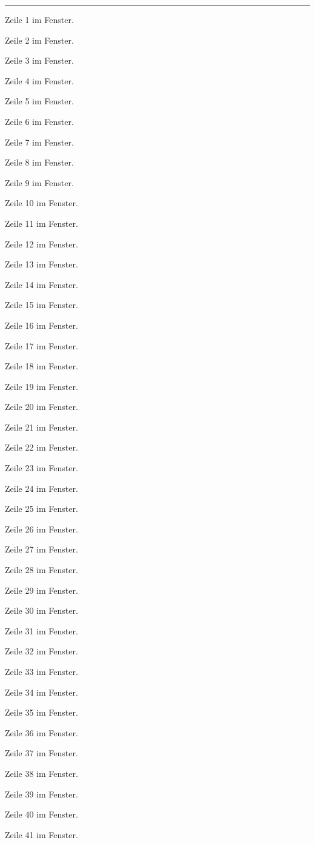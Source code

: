 \begin{Figure}[title=Tall Image Figure]
\rule{\linewidth}{90mm}
Zeile 1 im Fenster.

Zeile 2 im Fenster.

Zeile 3 im Fenster.

Zeile 4 im Fenster.

Zeile 5 im Fenster.

Zeile 6 im Fenster.

Zeile 7 im Fenster.

Zeile 8 im Fenster.

Zeile 9 im Fenster.

Zeile 10 im Fenster.

Zeile 11 im Fenster.

Zeile 12 im Fenster.

Zeile 13 im Fenster.

Zeile 14 im Fenster.

Zeile 15 im Fenster.

Zeile 16 im Fenster.

Zeile 17 im Fenster.

Zeile 18 im Fenster.

Zeile 19 im Fenster.

Zeile 20 im Fenster.

Zeile 21 im Fenster.

Zeile 22 im Fenster.

Zeile 23 im Fenster.

Zeile 24 im Fenster.

Zeile 25 im Fenster.

Zeile 26 im Fenster.

Zeile 27 im Fenster.

Zeile 28 im Fenster.

Zeile 29 im Fenster.

Zeile 30 im Fenster.

Zeile 31 im Fenster.

Zeile 32 im Fenster.

Zeile 33 im Fenster.

Zeile 34 im Fenster.

Zeile 35 im Fenster.

Zeile 36 im Fenster.

Zeile 37 im Fenster.

Zeile 38 im Fenster.

Zeile 39 im Fenster.

Zeile 40 im Fenster.

Zeile 41 im Fenster.


\end{Figure}
